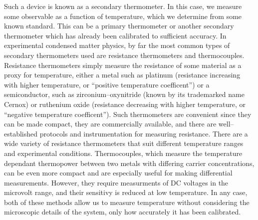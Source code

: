 \documentclass{thesis-umich}
\begin{document}
Such a device is known as a secondary thermometer. In this case, we
measure some observable as a function of temperature, which we determine
from some known standard. This can be a primary thermometer or another
secondary thermometer which has already been calibrated to sufficient
accuracy. In experimental condensed matter physics, by far the most
common types of secondary thermometers used are resistance thermometers
and thermocouples. Resistance thermometers simply measure the resistance
of some material as a proxy for temperature, either a metal such as
platinum (resistance increasing with higher temperature, or ``positive
temperature coefficent'') or a semiconductor, such as
zirconium--oxynitride (known by its trademarked name Cernox) or
ruthenium oxide (resistance decreasing with higher temperature, or
``negative temperature coefficent''). Such thermometers are convenient
since they can be made compact, they are commercially available, and
there are well--established protocols and instrumentation for measuring
resistance. There are a wide variety of resistance thermometers that
suit different temperature ranges and experimental conditions.
Thermocouples, which measure the temperature dependant thermopower
between two metals with differing carrier concentrations, can be even
more compact and are especially useful for making differential
measurements. However, they require measurments of DC voltages in the
microvolt range, and their sensitivy is reduced at low temperature. In
any case, both of these methods allow us to measure temperature without
considering the microscopic details of the system, only how accurately
it has been calibrated.
\end{document}
